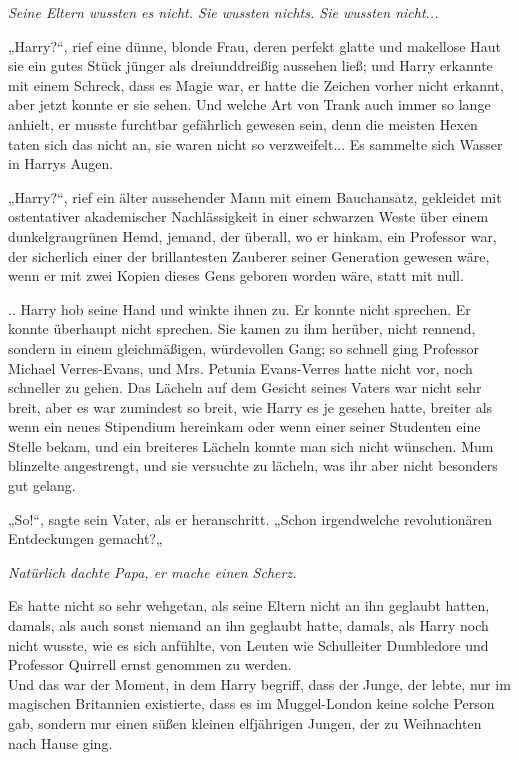 {\emph{Seine Eltern wussten es nicht. Sie wussten nichts. Sie wussten nicht...}

„Harry?“, rief eine dünne, blonde Frau, deren perfekt glatte und makellose Haut sie ein gutes Stück jünger als dreiunddreißig aussehen ließ; und Harry erkannte mit einem Schreck, dass es Magie war, er hatte die Zeichen vorher nicht erkannt, aber jetzt konnte er sie sehen. Und welche Art von Trank auch immer so lange anhielt, er musste furchtbar gefährlich gewesen sein, denn die meisten Hexen taten sich das nicht an, sie waren nicht so verzweifelt... Es sammelte sich Wasser in Harrys Augen.

„Harry?“, rief ein älter aussehender Mann mit einem Bauchansatz, gekleidet mit ostentativer akademischer Nachlässigkeit in einer schwarzen Weste über einem dunkelgraugrünen Hemd, jemand, der überall, wo er hinkam, ein Professor war, der sicherlich einer der brillantesten Zauberer seiner Generation gewesen wäre, wenn er mit zwei Kopien dieses Gens geboren worden wäre, statt mit null.

.. Harry hob seine Hand und winkte ihnen zu. Er konnte nicht sprechen. Er konnte überhaupt nicht sprechen. Sie kamen zu ihm herüber, nicht rennend, sondern in einem gleichmäßigen, würdevollen Gang; so schnell ging Professor Michael Verres-Evans, und Mrs. Petunia Evans-Verres hatte nicht vor, noch schneller zu gehen. Das Lächeln auf dem Gesicht seines Vaters war nicht sehr breit, aber es war zumindest so breit, wie Harry es je gesehen hatte, breiter als wenn ein neues Stipendium hereinkam oder wenn einer seiner Studenten eine Stelle bekam, und ein breiteres Lächeln konnte man sich nicht wünschen. Mum blinzelte angestrengt, und sie versuchte zu lächeln, was ihr aber nicht besonders gut gelang.

„So!“, sagte sein Vater, als er heranschritt. „Schon irgendwelche revolutionären Entdeckungen gemacht?„

\emph{Natürlich dachte Papa, er mache einen Scherz.}

Es hatte nicht so sehr wehgetan, als seine Eltern nicht an ihn geglaubt hatten, damals, als auch sonst niemand an ihn geglaubt hatte, damals, als Harry noch nicht wusste, wie es sich anfühlte, von Leuten wie Schulleiter Dumbledore und Professor Quirrell ernst genommen zu werden.\\ Und das war der Moment, in dem Harry begriff, dass der Junge, der lebte, nur im magischen Britannien existierte, dass es im Muggel-London keine solche Person gab, sondern nur einen süßen kleinen elfjährigen Jungen, der zu Weihnachten nach Hause ging.

}
